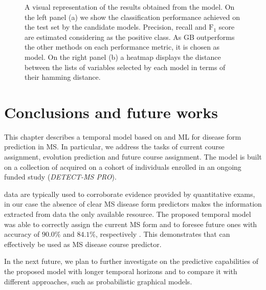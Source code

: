  \begin{figure}[]
	\centering
	 \hfill%
	\caption{A visual representation of the results obtained from the \F model. On the left panel (a) we show the classification performance achieved on the test set by the candidate models. Precision, recall and $\text{F}_1$ score are estimated considering \SP as the positive class. As GB outperforms the other methods on each performance metric, it is chosen as \F model. On the right panel (b) a heatmap displays the distance between the lists of variables selected by each model in terms of their hamming distance. }\label{fig:f}
\end{figure}





\section{Conclusions and future works}

This chapter describes a temporal model based on \PCOs and ML for disease form prediction in MS.
In particular, we address the tasks of current course assignment, \PCOs evolution prediction and future course assignment. The model is built on a collection of \PCOs acquired on a cohort of individuals enrolled in an ongoing funded study (\textit{DETECT-MS PRO}).

\PCOs data are typically used to corroborate evidence provided by quantitative exams, in our case the absence of clear MS disease form predictors makes the information extracted from \PCOs data the only available resource.
The proposed temporal model was able to correctly assign the current MS form and to foresee future ones with accuracy of $90.0\%$ and $84.1\%$, respectively .
This demonstrates that \PCOs can effectively be used as MS disease course predictor.

In the next future, we plan to further investigate on the predictive capabilities of the proposed model with longer temporal horizons and to compare it with different approaches, such as probabilistic graphical models.

